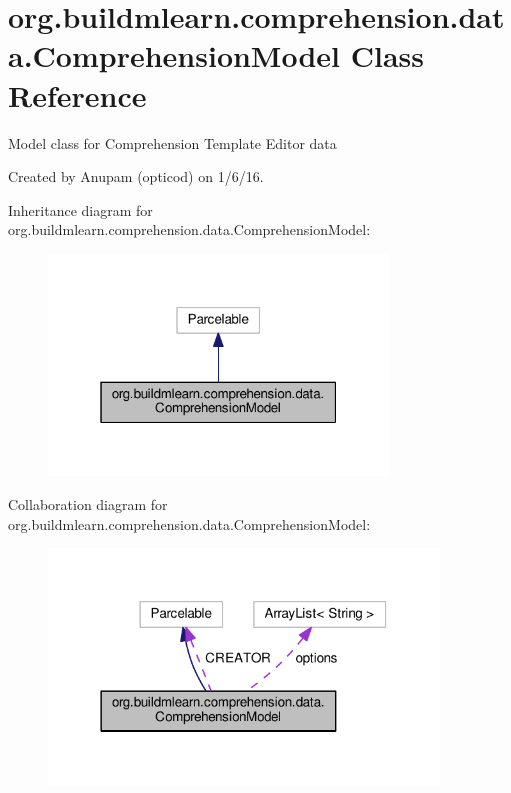\hypertarget{classorg_1_1buildmlearn_1_1comprehension_1_1data_1_1ComprehensionModel}{}\section{org.\+buildmlearn.\+comprehension.\+data.\+Comprehension\+Model Class Reference}
\label{classorg_1_1buildmlearn_1_1comprehension_1_1data_1_1ComprehensionModel}


Model class for Comprehension Template Editor data 

Created by Anupam (opticod) on 1/6/16.  




Inheritance diagram for org.\+buildmlearn.\+comprehension.\+data.\+Comprehension\+Model\+:
\nopagebreak
\begin{figure}[H]
\begin{center}
\leavevmode
\includegraphics[width=256pt]{classorg_1_1buildmlearn_1_1comprehension_1_1data_1_1ComprehensionModel__inherit__graph}
\end{center}
\end{figure}


Collaboration diagram for org.\+buildmlearn.\+comprehension.\+data.\+Comprehension\+Model\+:
\nopagebreak
\begin{figure}[H]
\begin{center}
\leavevmode
\includegraphics[width=294pt]{classorg_1_1buildmlearn_1_1comprehension_1_1data_1_1ComprehensionModel__coll__graph}
\end{center}
\end{figure}
